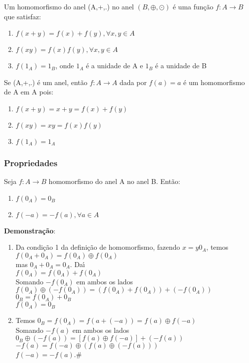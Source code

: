 \begin{definicao}[Homomorfismo] Um homomorfismo do anel (A,+,.) no anel $(B,\oplus,\odot)$ {\'e} uma fun{\c c}{\~a}o $f:A\rightarrow B$ que satisfaz:
\begin{enumerate}
\item $f(x+y)=f(x)+f(y),\forall x,y\in A$
\item $f(xy)=f(x)f(y),\forall x,y\in A$
\item $f(1_{A})=1_{B}$, onde $1_{A}$ {\'e} a unidade de A e $1_{B}$ {\'e} a unidade de B
\end{enumerate}
\end{definicao}

Se (A,+,.) {\'e} um anel, ent{\~a}o $f:A\rightarrow A$ dada por $f(a)=a$ {\'e} um homomorfismo de A em A pois:
\begin{enumerate}
\item $f(x+y)=x+y=f(x)+f(y)$
\item $f(xy)=xy=f(x)f(y)$
\item $f(1_{A})=1_{A}$
\end{enumerate}

\subsubsection{Propriedades}
\begin{proposicao} Seja $f:A\rightarrow B$ homomorfismo do anel A no anel B. Ent{\~a}o:
\begin{enumerate}
\item $f(0_{A})=0_{B}$
\item $f(-a)=-f(a),\forall a\in A$
\end{enumerate}
\end{proposicao}

\textbf{Demonstra{\c c}{\~a}o}:
\begin{enumerate}
\item Da condi{\c c}{\~a}o 1 da defini{\c c}{\~a}o de homomorfismo, fazendo $x=y0_{A}$, temos\\
$f(0_{A}+0_{A})=f(0_{A})\oplus f(0_{A})$\\
mas $0_{A}+0_{A}=0_{A}$. Da{\'\i}\\
$f(0_{A})=f(0_{A})+f(0_{A})$\\
Somando $-f(0_{A})$ em ambos os lados\\
$f(0_{A})\oplus(-f(0_{A}))=(f(0_{A})+f(0_{A}))+(-f(0_{A}))$\\
$0_{B}=f(0_{A})+0_{B}$\\
$f(0_{A})=0_{B}$
\item Temos $0_{B}=f(0_{A})=f(a+(-a))=f(a)\oplus f(-a)$\\
Somando $-f(a)$ em ambos os lados\\
$0_{B}\oplus(-f(a))=[f(a)\oplus f(-a)]+(-f(a))$
$-f(a)=f(-a)\oplus(f(a)\oplus(-f(a)))$\\
$f(-a)=-f(a)$.\#
\end{enumerate}


